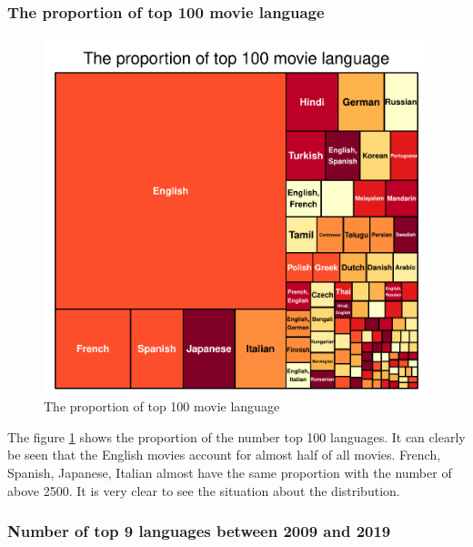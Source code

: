 \documentclass[11pt,a4paper,]{article}
\begin{document}
\hypertarget{the-proportion-of-top-100-movie-language}{%
\subsubsection{The proportion of top 100 movie language}\label{the-proportion-of-top-100-movie-language}}

\begin{figure}
\centering
\includegraphics{Report_files/figure-latex/language-1.pdf}
\caption{\label{fig:language}The proportion of top 100 movie language}
\end{figure}

The figure \ref{fig:language} shows the proportion of the number top 100 languages. It can clearly be seen that the English movies account for almost half of all movies. French, Spanish, Japanese, Italian almost have the same proportion with the number of above 2500. It is very clear to see the situation about the distribution.

\hypertarget{number-of-top-9-languages-between-2009-and-2019}{%
\subsubsection{Number of top 9 languages between 2009 and 2019}\label{number-of-top-9-languages-between-2009-and-2019}}
\end{document}
